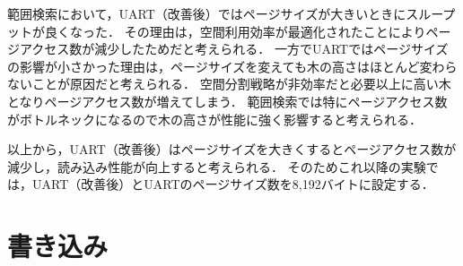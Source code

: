 範囲検索において，UART（改善後）ではページサイズが大きいときにスループットが良くなった．
その理由は，空間利用効率が最適化されたことによりページアクセス数が減少したためだと考えられる．
一方でUARTではページサイズの影響が小さかった理由は，ページサイズを変えても木の高さはほとんど変わらないことが原因だと考えられる．
空間分割戦略が非効率だと必要以上に高い木となりページアクセス数が増えてしまう．
範囲検索では特にページアクセス数がボトルネックになるので木の高さが性能に強く影響すると考えられる．

以上から，UART（改善後）はページサイズを大きくするとページアクセス数が減少し，読み込み性能が向上すると考えられる．
そのためこれ以降の実験では，UART（改善後）とUARTのページサイズ数を8,192バイトに設定する．

\section{書き込み}

